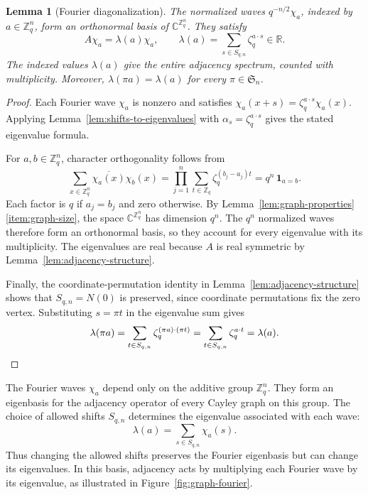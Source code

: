 \documentclass[11pt,a4paper]{article}
\numberwithin{equation}{section}
\numberwithin{figure}{section}
\numberwithin{table}{section}
\numberwithin{footnote}{section}
\newtheorem{lemma}[theorem]{Lemma}
\theoremstyle{informal}\newtheorem*{informaltheorem}{Informal theorem}
\theoremstyle{definition}\newtheorem{example}{Example}[section]
\theoremstyle{remark}\newtheorem{remark}[theorem]{Remark}
\newcommand{\Z}{\mathbb Z}
\newcommand{\C}{\mathbb C}
\begin{document}
\begin{lemma}[Fourier diagonalization]\label{lem:fourier-diagonalization}
The normalized waves \(q^{-n/2}\chi_a\), indexed by
\(a\in\Z_q^n\), form an orthonormal basis of \(\C^{\Z_q^n}\).
They satisfy
\begin{equation}
 A\chi_a=\lambda(a)\chi_a,
 \qquad
 \lambda(a)=\sum_{s\in S_{q,n}}\zeta_q^{a\cdot s}\in\mathbb R.
\end{equation}
The indexed values \(\lambda(a)\) give the entire adjacency spectrum,
counted with multiplicity. Moreover, \(\lambda(\pi a)=\lambda(a)\)
for every \(\pi\in\mathfrak S_n\).
\end{lemma}
\begin{proof}
Each Fourier wave \(\chi_a\) is nonzero and satisfies
\(\chi_a(x+s)=\zeta_q^{a\cdot s}\chi_a(x)\).
Applying Lemma~\ref{lem:shifts-to-eigenvalues} with
\(\alpha_s=\zeta_q^{a\cdot s}\) gives the stated eigenvalue formula.

For \(a,b\in\Z_q^n\), character orthogonality follows from
\begin{equation}
 \sum_{x\in\Z_q^n}\overline{\chi_a(x)}\chi_b(x)
 =\prod_{j=1}^n\sum_{t\in\Z_q}\zeta_q^{(b_j-a_j)t}
 =q^n\,\boldsymbol{1}_{a=b}.
\end{equation}
Each factor is \(q\) if \(a_j=b_j\) and zero otherwise.
By Lemma~\ref{lem:graph-properties}\,\ref{item:graph-size}, the space
\(\C^{\Z_q^n}\) has dimension \(q^n\). The \(q^n\) normalized waves
therefore form an orthonormal basis, so they account for every eigenvalue
with its multiplicity. The eigenvalues are real because \(A\) is real
symmetric by Lemma~\ref{lem:adjacency-structure}.

Finally, the coordinate-permutation identity in
Lemma~\ref{lem:adjacency-structure} shows that \(S_{q,n}=N(0)\)
is preserved, since coordinate permutations fix the zero vertex.
Substituting \(s=\pi t\) in the eigenvalue sum gives
\begin{equation}
 \lambda(\pi a)
 =\sum_{t\in S_{q,n}}\zeta_q^{(\pi a)\cdot(\pi t)}
 =\sum_{t\in S_{q,n}}\zeta_q^{a\cdot t}
 =\lambda(a).\qedhere
\end{equation}
\end{proof}

The Fourier waves \(\chi_a\) depend only on the additive group
\(\Z_q^n\). They form an eigenbasis for the adjacency operator of
every Cayley graph on this group. The choice of allowed shifts
\(S_{q,n}\) determines the eigenvalue associated with each wave:
\begin{equation}
 \lambda(a)=\sum_{s\in S_{q,n}}\chi_a(s).
\end{equation}
Thus changing the allowed shifts preserves the Fourier eigenbasis
but can change its eigenvalues. In this basis, adjacency acts by
multiplying each Fourier wave by its eigenvalue, as illustrated in
Figure~\ref{fig:graph-fourier}.
\end{document}
